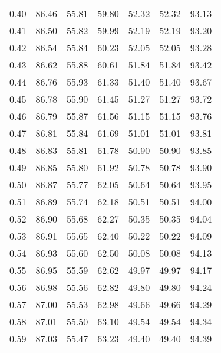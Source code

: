 \begin{tabular}{|c|c|c|c|c|c|c|}
      0.40 &     86.46 &     55.81 &      59.80 &   52.32 &      52.32 &         93.13 \\
      0.41 &     86.50 &     55.82 &      59.99 &   52.19 &      52.19 &         93.20 \\
      0.42 &     86.54 &     55.84 &      60.23 &   52.05 &      52.05 &         93.28 \\
      0.43 &     86.62 &     55.88 &      60.61 &   51.84 &      51.84 &         93.42 \\
      0.44 &     86.76 &     55.93 &      61.33 &   51.40 &      51.40 &         93.67 \\
      0.45 &     86.78 &     55.90 &      61.45 &   51.27 &      51.27 &         93.72 \\
      0.46 &     86.79 &     55.87 &      61.56 &   51.15 &      51.15 &         93.76 \\
      0.47 &     86.81 &     55.84 &      61.69 &   51.01 &      51.01 &         93.81 \\
      0.48 &     86.83 &     55.81 &      61.78 &   50.90 &      50.90 &         93.85 \\
      0.49 &     86.85 &     55.80 &      61.92 &   50.78 &      50.78 &         93.90 \\
      0.50 &     86.87 &     55.77 &      62.05 &   50.64 &      50.64 &         93.95 \\
      0.51 &     86.89 &     55.74 &      62.18 &   50.51 &      50.51 &         94.00 \\
      0.52 &     86.90 &     55.68 &      62.27 &   50.35 &      50.35 &         94.04 \\
      0.53 &     86.91 &     55.65 &      62.40 &   50.22 &      50.22 &         94.09 \\
      0.54 &     86.93 &     55.60 &      62.50 &   50.08 &      50.08 &         94.13 \\
      0.55 &     86.95 &     55.59 &      62.62 &   49.97 &      49.97 &         94.17 \\
      0.56 &     86.98 &     55.56 &      62.82 &   49.80 &      49.80 &         94.24 \\
      0.57 &     87.00 &     55.53 &      62.98 &   49.66 &      49.66 &         94.29 \\
      0.58 &     87.01 &     55.50 &      63.10 &   49.54 &      49.54 &         94.34 \\
      0.59 &     87.03 &     55.47 &      63.23 &   49.40 &      49.40 &         94.39 \\

\end{tabular}
